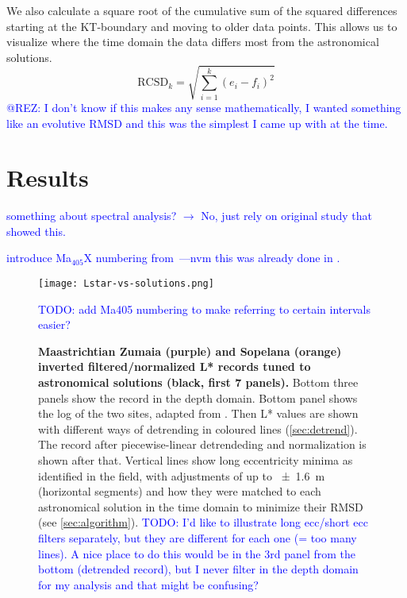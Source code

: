 \documentclass[draft]{agujournal2019}
\newcommand{\ijk}{\textcolor{blue}}
\begin{document}
We also calculate a square root of the cumulative sum of the squared differences starting at the \gls{KT}-boundary and moving to older data points.
This allows us to visualize where the time domain the data differs most from the astronomical solutions.
\begin{equation}\label{eqn:cumsum}
    \text{RCSD}_{k} = \sqrt{\sum_{i=1}^{k}(e_{i} - f_{i})^{2}}
\end{equation}
\ijk{@REZ: I don't know if this makes any sense mathematically, I wanted something like an evolutive RMSD and this was the simplest I came up with at the time.}

\section{Results}\label{sec:results}

\ijk{something about spectral analysis? \(\to{}\) No, just rely on original study that showed this.}

\ijk{introduce Ma\(_{405}\)X numbering from~\cite{Husson2011}---nvm this was already done in .}


\begin{figure}[htb]
  \centering
  \texttt{[image: Lstar-vs-solutions.png]}
  \caption{\label{fig:rolling-depth-age}
    \textbf{Maastrichtian Zumaia (purple) and Sopelana (orange) inverted filtered/normalized \gls{L*} records tuned to astronomical solutions (black, first 7 panels).}
    Bottom three panels show the record in the depth domain.
    Bottom panel shows the log of the two sites, adapted from .
    Then \gls{L*} values are shown with different ways of detrending in coloured lines (\cref{sec:detrend}).
    The record after piecewise-linear detrendeding and normalization is shown after that.
    Vertical lines show long eccentricity minima as identified in the field,
    with adjustments of up to \qty{\pm1.6}{\metre} (horizontal segments)
    and how they were matched to each astronomical solution in the time domain to minimize their \gls{RMSD} (see \cref{sec:algorithm}).
    \ijk{TODO: I'd like to illustrate long ecc/short ecc filters separately,
         but they are different for each one (= too many lines).
         A nice place to do this would be in the 3rd panel from the bottom (detrended record),
         but I never filter in the depth domain for my analysis and that might be confusing?}
    }
    \ijk{TODO: add Ma405 numbering to make referring to certain intervals easier?}
\end{figure}
\end{document}
